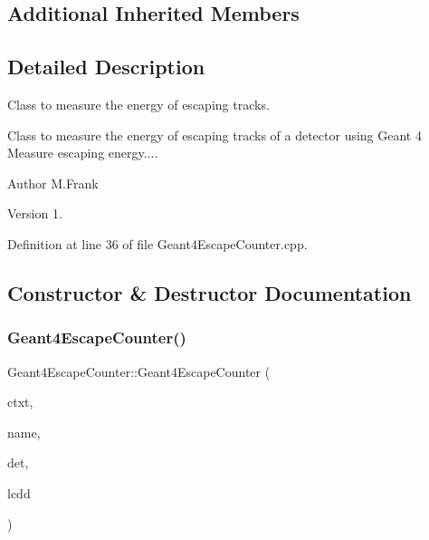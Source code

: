 \subsection*{Additional Inherited Members}


\subsection{Detailed Description}
Class to measure the energy of escaping tracks. 

Class to measure the energy of escaping tracks of a detector using Geant 4 Measure escaping energy....

\begin{DoxyAuthor}{Author}
M.\+Frank 
\end{DoxyAuthor}
\begin{DoxyVersion}{Version}
1. 
\end{DoxyVersion}


Definition at line 36 of file Geant4\+Escape\+Counter.\+cpp.



\subsection{Constructor \& Destructor Documentation}
\hypertarget{class_d_d4hep_1_1_simulation_1_1_geant4_escape_counter_a47072d02040a53cfa77a4f893f5aeaa9}{}\label{class_d_d4hep_1_1_simulation_1_1_geant4_escape_counter_a47072d02040a53cfa77a4f893f5aeaa9} 
\subsubsection{\texorpdfstring{Geant4\+Escape\+Counter()}{Geant4EscapeCounter()}}
{\footnotesize\ttfamily Geant4\+Escape\+Counter\+::\+Geant4\+Escape\+Counter (\begin{DoxyParamCaption}\item[{\hyperlink{class_d_d4hep_1_1_simulation_1_1_geant4_context}{Geant4\+Context} $\ast$}]{ctxt,  }\item[{const std\+::string \&}]{name,  }\item[{\hyperlink{class_d_d4hep_1_1_simulation_1_1_geant4_sensitive_a1cb1af5fb1194be1e1c1137f1e54272b}{Det\+Element}}]{det,  }\item[{\hyperlink{class_d_d4hep_1_1_simulation_1_1_geant4_sensitive_a3373caa6917867ca7c871df20fb467c8}{L\+C\+DD} \&}]{lcdd }\end{DoxyParamCaption})}



